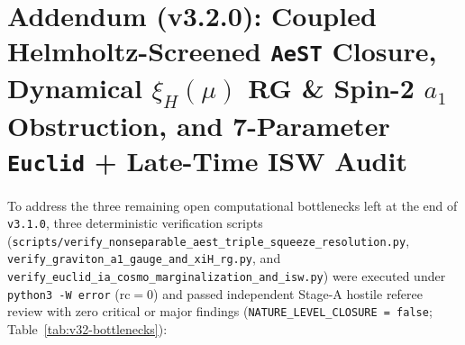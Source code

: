 \documentclass[11pt,a4paper]{article}
\begin{document}
\begin{table}[t]
\centering
{}
\caption{Addendum (\texttt{v3.1.0}) five-module \texttt{Q-DEC}/\texttt{T-DEC} verification summary (\texttt{NATURE\_LEVEL\_CLOSURE = false}).}
\label{tab:v31-qdec-tdec}
\end{table}

\section{Addendum (v3.2.0): Coupled Helmholtz-Screened \texttt{AeST} Closure, Dynamical \texorpdfstring{$\xi_H(\mu)$}{xi\_H(mu)} RG \& Spin-2 \texorpdfstring{$a_1$}{a1} Obstruction, and 7-Parameter \texttt{Euclid} + Late-Time ISW Audit}
\label{sec:v32-bottlenecks}

To address the three remaining open computational bottlenecks left at the end of \texttt{v3.1.0}, three deterministic verification scripts (\texttt{scripts/\allowbreak verify\_\allowbreak nonseparable\_\allowbreak aest\_\allowbreak triple\_\allowbreak squeeze\_\allowbreak resolution.py}, \texttt{verify\_\allowbreak graviton\_\allowbreak a1\_\allowbreak gauge\_\allowbreak and\_\allowbreak xiH\_\allowbreak rg.py}, and \texttt{verify\_\allowbreak euclid\_\allowbreak ia\_\allowbreak cosmo\_\allowbreak marginalization\_\allowbreak and\_\allowbreak isw.py}) were executed under \texttt{python3 -W error} ($\mathrm{rc}=0$) and passed independent Stage-A hostile referee review with zero critical or major findings (\texttt{NATURE\_\allowbreak LEVEL\_\allowbreak CLOSURE = false}; Table~\ref{tab:v32-bottlenecks}):
\end{document}
